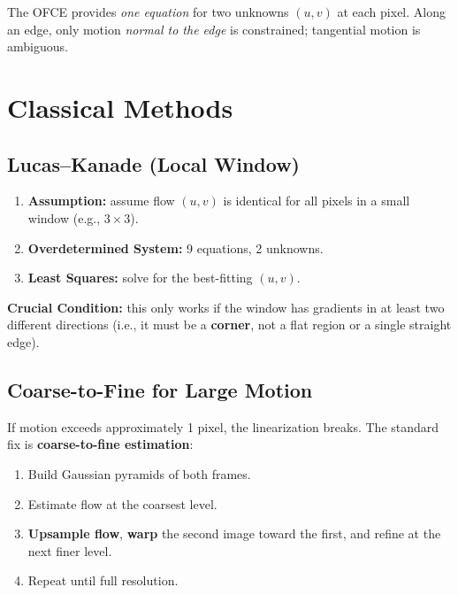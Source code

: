 \documentclass[11pt, oneside]{book}
\begin{document}
\begin{defbox}[title={Aperture Problem}]
The OFCE provides \emph{one equation} for two unknowns $(u,v)$ at each pixel.
Along an edge, only motion \emph{normal to the edge} is constrained; tangential motion is ambiguous.
\end{defbox}

\section{Classical Methods}

\subsection{Lucas--Kanade (Local Window)}

\begin{thmbox}[title={Lucas-Kanade Solution}]
\begin{enumerate}
  \item \textbf{Assumption:} assume flow $(u,v)$ is identical for all pixels in a small window (e.g., $3 \times 3$).
  \item \textbf{Overdetermined System:} 9 equations, 2 unknowns.
  \item \textbf{Least Squares:} solve for the best-fitting $(u,v)$.
\end{enumerate}
\textbf{Crucial Condition:} this only works if the window has gradients in at least two different directions
(i.e., it must be a \textbf{corner}, not a flat region or a single straight edge).
\end{thmbox}

\subsection{Coarse-to-Fine for Large Motion}

If motion exceeds approximately 1 pixel, the linearization breaks. The standard fix is \textbf{coarse-to-fine estimation}:

\begin{enumerate}
  \item Build Gaussian pyramids of both frames.
  \item Estimate flow at the coarsest level.
  \item \textbf{Upsample flow}, \textbf{warp} the second image toward the first, and refine at the next finer level.
  \item Repeat until full resolution.
\end{enumerate}
\end{document}
